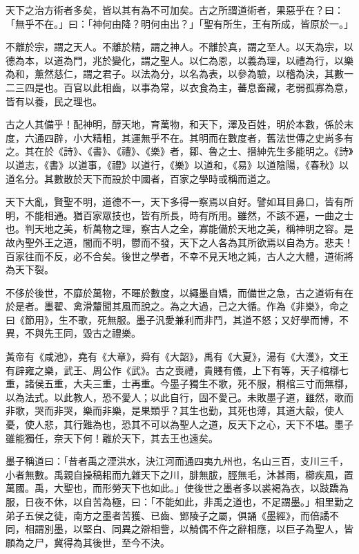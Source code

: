 
\begin{pinyinscope}
天下之治方術者多矣，皆以其有為不可加矣。古之所謂道術者，果惡乎在？曰：「無乎不在。」曰：「神何由降？明何由出？」「聖有所生，王有所成，皆原於一。」

不離於宗，謂之天人。不離於精，謂之神人。不離於真，謂之至人。以天為宗，以德為本，以道為門，兆於變化，謂之聖人。以仁為恩，以義為理，以禮為行，以樂為和，薰然慈仁，謂之君子。以法為分，以名為表，以參為驗，以稽為決，其數一二三四是也。百官以此相齒，以事為常，以衣食為主，蕃息畜藏，老弱孤寡為意，皆有以養，民之理也。

古之人其備乎！配神明，醇天地，育萬物，和天下，澤及百姓，明於本數，係於末度，六通四辟，小大精粗，其運無乎不在。其明而在數度者，舊法世傳之史尚多有之。其在於《詩》、《書》、《禮》、《樂》者，鄒、魯之士、搢紳先生多能明之。《詩》以道志，《書》以道事，《禮》以道行，《樂》以道和，《易》以道陰陽，《春秋》以道名分。其數散於天下而設於中國者，百家之學時或稱而道之。

天下大亂，賢聖不明，道德不一，天下多得一察焉以自好。譬如耳目鼻口，皆有所明，不能相通。猶百家眾技也，皆有所長，時有所用。雖然，不該不遍，一曲之士也。判天地之美，析萬物之理，察古人之全，寡能備於天地之美，稱神明之容。是故內聖外王之道，闇而不明，鬱而不發，天下之人各為其所欲焉以自為方。悲夫！百家往而不反，必不合矣。後世之學者，不幸不見天地之純，古人之大體，道術將為天下裂。

不侈於後世，不靡於萬物，不暉於數度，以繩墨自矯，而備世之急，古之道術有在於是者。墨翟、禽滑釐聞其風而說之。為之大過，己之大循。作為《非樂》，命之曰《節用》，生不歌，死無服。墨子汎愛兼利而非鬥，其道不怒；又好學而博，不異，不與先王同，毀古之禮樂。

黃帝有《咸池》，堯有《大章》，舜有《大韶》，禹有《大夏》，湯有《大濩》，文王有辟雍之樂，武王、周公作《武》。古之喪禮，貴賤有儀，上下有等，天子棺槨七重，諸侯五重，大夫三重，士再重。今墨子獨生不歌，死不服，桐棺三寸而無槨，以為法式。以此教人，恐不愛人；以此自行，固不愛己。未敗墨子道，雖然，歌而非歌，哭而非哭，樂而非樂，是果類乎？其生也勤，其死也薄，其道大觳，使人憂，使人悲，其行難為也，恐其不可以為聖人之道，反天下之心，天下不堪。墨子雖能獨任，奈天下何！離於天下，其去王也遠矣。

墨子稱道曰：「昔者禹之湮洪水，決江河而通四夷九州也，名山三百，支川三千，小者無數。禹親自操稿耜而九雜天下之川，腓無胈，脛無毛，沐甚雨，櫛疾風，置萬國。禹，大聖也，而形勞天下也如此。」使後世之墨者多以裘褐為衣，以跂蹻為服，日夜不休，以自苦為極，曰：「不能如此，非禹之道也，不足謂墨。」相里勤之弟子五侯之徒，南方之墨者苦獲、已齒、鄧陵子之屬，俱誦《墨經》，而倍譎不同，相謂別墨，以堅白、同異之辯相訾，以觭偶不仵之辭相應，以巨子為聖人，皆願為之尸，冀得為其後世，至今不決。


\end{pinyinscope}
